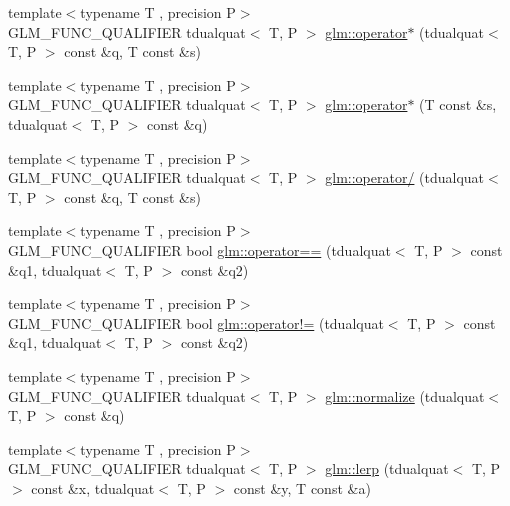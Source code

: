 \begin{DoxyCompactItemize}
\item 
{\footnotesize template$<$typename T , precision P$>$ }\\G\+L\+M\+\_\+\+F\+U\+N\+C\+\_\+\+Q\+U\+A\+L\+I\+F\+I\+E\+R tdualquat$<$ T, P $>$ \hyperlink{group__gtx__dual__quaternion_ga5251d67271c42cf52227b6254f3fc8ed}{glm\+::operator$\ast$} (tdualquat$<$ T, P $>$ const \&q, T const \&s)
\item 
{\footnotesize template$<$typename T , precision P$>$ }\\G\+L\+M\+\_\+\+F\+U\+N\+C\+\_\+\+Q\+U\+A\+L\+I\+F\+I\+E\+R tdualquat$<$ T, P $>$ \hyperlink{group__gtx__dual__quaternion_ga0aedf77f3e7d45464501570c28df0ed7}{glm\+::operator$\ast$} (T const \&s, tdualquat$<$ T, P $>$ const \&q)
\item 
{\footnotesize template$<$typename T , precision P$>$ }\\G\+L\+M\+\_\+\+F\+U\+N\+C\+\_\+\+Q\+U\+A\+L\+I\+F\+I\+E\+R tdualquat$<$ T, P $>$ \hyperlink{group__gtx__dual__quaternion_gad27b1d064624dd6ff1ecc205616323ba}{glm\+::operator/} (tdualquat$<$ T, P $>$ const \&q, T const \&s)
\item 
{\footnotesize template$<$typename T , precision P$>$ }\\G\+L\+M\+\_\+\+F\+U\+N\+C\+\_\+\+Q\+U\+A\+L\+I\+F\+I\+E\+R bool \hyperlink{namespaceglm_aad95e2ae87bce8bf591ce20fc6997f49}{glm\+::operator==} (tdualquat$<$ T, P $>$ const \&q1, tdualquat$<$ T, P $>$ const \&q2)
\item 
{\footnotesize template$<$typename T , precision P$>$ }\\G\+L\+M\+\_\+\+F\+U\+N\+C\+\_\+\+Q\+U\+A\+L\+I\+F\+I\+E\+R bool \hyperlink{namespaceglm_a7720bbb7f60c8f0780ddd38e2f651331}{glm\+::operator!=} (tdualquat$<$ T, P $>$ const \&q1, tdualquat$<$ T, P $>$ const \&q2)
\item 
{\footnotesize template$<$typename T , precision P$>$ }\\G\+L\+M\+\_\+\+F\+U\+N\+C\+\_\+\+Q\+U\+A\+L\+I\+F\+I\+E\+R tdualquat$<$ T, P $>$ \hyperlink{group__gtx__dual__quaternion_ga495818aa48c23e9e730f87a3c337d1d5}{glm\+::normalize} (tdualquat$<$ T, P $>$ const \&q)
\item 
{\footnotesize template$<$typename T , precision P$>$ }\\G\+L\+M\+\_\+\+F\+U\+N\+C\+\_\+\+Q\+U\+A\+L\+I\+F\+I\+E\+R tdualquat$<$ T, P $>$ \hyperlink{group__gtx__dual__quaternion_ga8039b88397ca09275be924a26a806a59}{glm\+::lerp} (tdualquat$<$ T, P $>$ const \&x, tdualquat$<$ T, P $>$ const \&y, T const \&a)
\item 

\end{DoxyCompactItemize}
